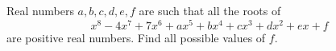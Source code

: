 Real numbers $a,b,c,d,e,f$ are such that all the roots of
\[x^8-4x^7+7x^6+ax^5+bx^4+cx^3+dx^2+ex+f\]
are positive real numbers. Find all possible values of $f$.
